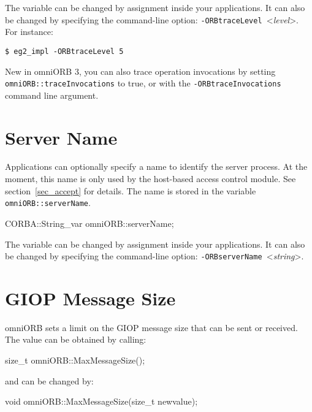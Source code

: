 \documentclass[11pt,twoside,a4paper]{book}
\newcommand{\code}[1]{\texttt{#1}}
\newcommand{\cmdline}[1]{\texttt{#1}}
\begin{document}
\vspace{\baselineskip}

\noindent The variable can be changed by assignment inside your
applications. It can also be changed by specifying the command-line
option: \cmdline{-ORBtraceLevel }<\textit{level}>. For instance:

\begin{verbatim}
$ eg2_impl -ORBtraceLevel 5
\end{verbatim}


New in omniORB 3, you can also trace operation invocations by setting
\code{omniORB::traceInvocations} to true, or with the
\cmdline{-ORBtraceInvocations} command line argument.



\section{Server Name}
\label{sec_servername}

Applications can optionally specify a name to identify the server
process. At the moment, this name is only used by the host-based
access control module. See section~\ref{sec_accept} for details. The
name is stored in the variable \code{omniORB::serverName}.

\begin{cxxlisting}
CORBA::String_var omniORB::serverName;
\end{cxxlisting}

\noindent The variable can be changed by assignment inside your
applications. It can also be changed by specifying the command-line
option: \cmdline{-ORBserverName }<\textit{string}>.
 

\section{GIOP Message Size}
\label{giopmsg}

omniORB sets a limit on the GIOP message size that can be sent or
received. The value can be obtained by calling:

\begin{cxxlisting}
size_t omniORB::MaxMessageSize();
\end{cxxlisting}

\noindent and can be changed by:

\begin{cxxlisting}
void omniORB::MaxMessageSize(size_t newvalue);
\end{cxxlisting}
\end{document}
